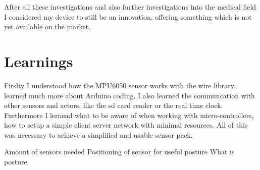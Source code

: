 After all these investigations and also further investigations into the medical field I considered my device to still be an innovation, offering something which is not yet available on the market.

\newpage

\section{Learnings}

Firslty I understood how the MPU6050 sensor works with the wire library, learned much more about Arduino coding. I also learned the communcation with other sensors and actors, like the sd card reader or the real time clock. Furthermore I lernead what to be aware of when working with micro-controllers, how to setup a simple client server network with minimal resources. All of this was necessary to achieve a simplified and usable sensor pack. 

Amount of sensors needed
Positioning of sensor for useful posture
What is posture